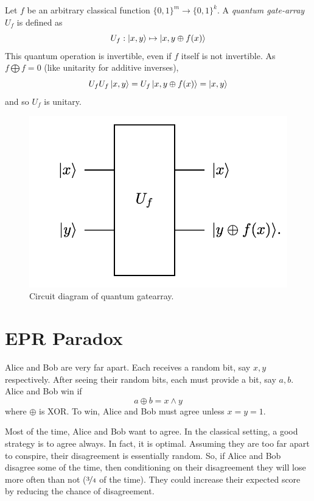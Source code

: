 \documentclass{article}
\begin{document}
\begin{defn}
Let $f$ be an arbitrary classical function $\{0, 1\}^m \to \{0,1\}^k$. A \textit{quantum gate-array} $U_f$ is defined as
\begin{equation}
    U_f: \ket{x, y} \mapsto \ket{x, y \oplus f(x)}
\end{equation}
This quantum operation is invertible, even if $f$ itself is not invertible. As $f \bigoplus f = 0$ (like unitarity for additive inverses), 
\begin{equation}
    U_f U_f \ket{x, y} = U_f \ket{x, y \oplus f(x)} = \ket{x, y}
\end{equation}
and so $U_f$ is unitary.

\begin{figure}
    \centering
    \includegraphics[width=0.5\linewidth]{pics/Gatearray.png}
    \caption{Circuit diagram of quantum gatearray.  \cite{rieffel1998introduction}}
    \label{fig:gatearray}
\end{figure}
\end{defn}
\section{EPR Paradox}
\begin{defn}
 Alice and Bob are very far apart. Each receives a random bit, say $x, y$ respectively. After seeing their random bits, each must provide a bit, say $a, b$. Alice and Bob win if
 \begin{equation}
     a \oplus b = x \land y
 \end{equation}
where $\oplus$ is XOR. To win, Alice and Bob must agree unless $x=y=1$. 
\end{defn}
 
Most of the time, Alice and Bob want to agree. In the classical setting, a good strategy is to agree always. In fact, it is optimal. Assuming they are too far apart to conspire, their disagreement is essentially random. So, if Alice and Bob disagree some of the time, then conditioning on their disagreement they will lose more often than not ($\nicefrac{3}{4}$ of the time). They could increase their expected score by reducing the chance of disagreement. 
\end{document}
